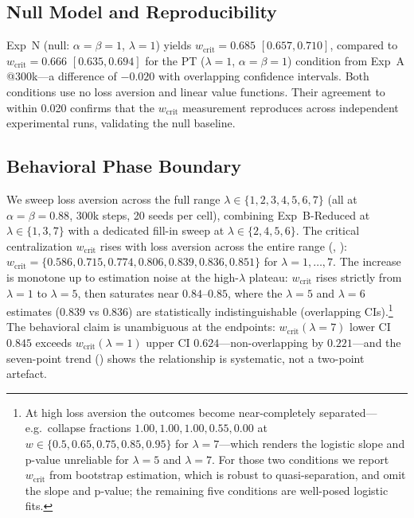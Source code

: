 \documentclass[11pt]{article}
\newcommand{\wcrit}{w_{\mathrm{crit}}}
\begin{document}
\subsection{Null Model and Reproducibility}
\label{sec:results_null}

Exp~N (null: $\alpha{=}\beta{=}1$, $\lambda{=}1$) yields
$\wcrit = 0.685$ $[0.657, 0.710]$, compared to $\wcrit = 0.666$
$[0.635, 0.694]$ for the PT ($\lambda{=}1$, $\alpha{=}\beta{=}1$) condition
from Exp~A @300k---a difference of $-0.020$ with overlapping confidence
intervals.
Both conditions use no loss aversion and linear value functions.
Their agreement to within 0.020 confirms that the $\wcrit$ measurement
reproduces across independent experimental runs, validating the null
baseline.

\subsection{Behavioral Phase Boundary}
\label{sec:results_behavioral}

We sweep loss aversion across the full range $\lambda \in \{1,2,3,4,5,6,7\}$
(all at $\alpha{=}\beta{=}0.88$, 300k steps, 20 seeds per cell), combining
Exp~B-Reduced at $\lambda \in \{1,3,7\}$ with a dedicated fill-in sweep at
$\lambda \in \{2,4,5,6\}$.
The critical centralization $\wcrit$ rises with loss aversion across the entire
range (, ):
$\wcrit = \{0.586, 0.715, 0.774, 0.806, 0.839, 0.836, 0.851\}$ for
$\lambda = 1,\ldots,7$.
The increase is monotone up to estimation noise at the high-$\lambda$ plateau:
$\wcrit$ rises strictly from $\lambda{=}1$ to $\lambda{=}5$, then saturates near
$0.84$--$0.85$, where the $\lambda{=}5$ and $\lambda{=}6$ estimates
($0.839$ vs $0.836$) are statistically indistinguishable (overlapping CIs).\footnote{%
  At high loss aversion the outcomes become near-completely separated---e.g.\
  collapse fractions $1.00, 1.00, 1.00, 0.55, 0.00$ at
  $w \in \{0.5, 0.65, 0.75, 0.85, 0.95\}$ for $\lambda{=}7$---which renders the
  logistic slope and p-value unreliable for $\lambda{=}5$ and $\lambda{=}7$.
  For those two conditions we report $\wcrit$ from bootstrap estimation, which
  is robust to quasi-separation, and omit the slope and p-value; the remaining
  five conditions are well-posed logistic fits.}
The behavioral claim is unambiguous at the endpoints: $\wcrit(\lambda{=}7)$
lower CI $0.845$ exceeds $\wcrit(\lambda{=}1)$ upper CI $0.624$---non-overlapping
by $0.221$---and the seven-point trend (\Cref{fig:wcrit_lambda}) shows the
relationship is systematic, not a two-point artefact.
\end{document}
